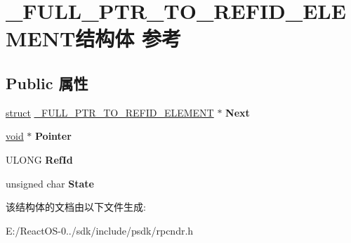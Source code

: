 \hypertarget{struct___f_u_l_l___p_t_r___t_o___r_e_f_i_d___e_l_e_m_e_n_t}{}\section{\+\_\+\+F\+U\+L\+L\+\_\+\+P\+T\+R\+\_\+\+T\+O\+\_\+\+R\+E\+F\+I\+D\+\_\+\+E\+L\+E\+M\+E\+N\+T结构体 参考}
\label{struct___f_u_l_l___p_t_r___t_o___r_e_f_i_d___e_l_e_m_e_n_t}
\subsection*{Public 属性}
\begin{DoxyCompactItemize}
\item 
\mbox{\label{struct___f_u_l_l___p_t_r___t_o___r_e_f_i_d___e_l_e_m_e_n_t_a2740fd3c1f945ccc70d960d2756396d0}} 
\hyperlink{interfacestruct}{struct} \hyperlink{struct___f_u_l_l___p_t_r___t_o___r_e_f_i_d___e_l_e_m_e_n_t}{\+\_\+\+F\+U\+L\+L\+\_\+\+P\+T\+R\+\_\+\+T\+O\+\_\+\+R\+E\+F\+I\+D\+\_\+\+E\+L\+E\+M\+E\+NT} $\ast$ {\bfseries Next}
\item 
\mbox{\label{struct___f_u_l_l___p_t_r___t_o___r_e_f_i_d___e_l_e_m_e_n_t_ac79c826b977034522368b60ff1466f2f}} 
\hyperlink{interfacevoid}{void} $\ast$ {\bfseries Pointer}
\item 
\mbox{\label{struct___f_u_l_l___p_t_r___t_o___r_e_f_i_d___e_l_e_m_e_n_t_aaab5ca25ea27661961d6291ff0485a70}} 
U\+L\+O\+NG {\bfseries Ref\+Id}
\item 
\mbox{\label{struct___f_u_l_l___p_t_r___t_o___r_e_f_i_d___e_l_e_m_e_n_t_a61dd0f754ba9ed6a8fe584f23f808f71}} 
unsigned char {\bfseries State}
\end{DoxyCompactItemize}


该结构体的文档由以下文件生成\+:\begin{DoxyCompactItemize}
\item 
E\+:/\+React\+O\+S-\/0../sdk/include/psdk/rpcndr.\+h\end{DoxyCompactItemize}
